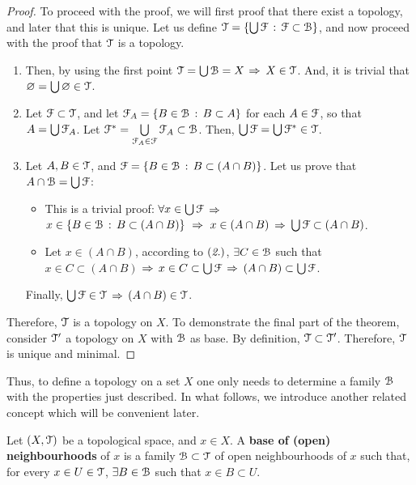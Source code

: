 \begin{proof}
	To proceed with the proof, we will first proof that there exist a topology, and later
	that this is unique.
	Let us define $\EuScript{T} = \{\bigcup \EuScript{F}\,:\,\EuScript{F}\subset \EuScript{B}\}$, and now proceed with the proof 
	that $\EuScript{T}$ is a topology.
	\begin{enumerate}
		\item Then, by using the first point $\EuScript{T} =\bigcup \EuScript{B}= X$ $\Rightarrow$ $X\in \EuScript{T}$. And, it
		is trivial that $\varnothing = \bigcup \varnothing \in \EuScript{T}$.
		
		\item Let $\EuScript{F}\subset \EuScript{T}$, and let $\EuScript{F}_A=\{B\in \EuScript{B}\,:\, B\subset A\}$ for each 
		$A\in\EuScript{F}$, so that $A=\bigcup\EuScript{F}_A$. Let $\EuScript{F}^*=\bigcup\limits_{\EuScript{F}_A\in\EuScript{F}}\EuScript{F}_A\subset\EuScript{B}$.
		Then,  $\bigcup \EuScript{F} =\bigcup\EuScript{F}^*\in\EuScript{T}$.
		
		\item Let $A, B\in \EuScript{T}$, and $\EuScript{F} = \{B\in\EuScript{B}\,:\, B \subset(A\cap B)\}$.
		Let us prove that $A\cap\EuScript{B} = \bigcup\EuScript{F}$:
		\begin{itemize}
			\item[\boxed{\supseteq}] This is a trivial proof: $\forall x\in\bigcup\EuScript{F}$ $\Rightarrow$
			$x\in\left\{B\in\EuScript{B}\,:\,B\subset(A\cap B)\right\}\ \Rightarrow\ x\in (A\cap B)$ $\Rightarrow$ 
			$\bigcup\EuScript{F} \subset (A\cap B)$.
			\item[\boxed{\subseteq}] Let $x\in (A\cap B)$, according to $(\emph{2.})$, 
			$\exists C\in \EuScript{B}$ such that $x\in C\subset (A\cap B)$ $\Rightarrow$ $x\in C\subset 
			\bigcup\EuScript{F}$ $\Rightarrow$ $(A\cap B)\subset \bigcup\EuScript{F}$.
		\end{itemize}
		Finally, $\bigcup \EuScript{F}\in \EuScript{T}$ $\Rightarrow$ $(A\cap B) \in \EuScript{T}$.
	\end{enumerate}
	Therefore, $\EuScript{T}$ is a topology on $X$.
	To demonstrate the final part of the theorem, consider $\EuScript{T}'$ a topology on $X$ with 
	$\EuScript{B}$ as base. By definition, $\EuScript{T}\subset \EuScript{T}'$. Therefore, $\EuScript{T}$ is unique and minimal.
\end{proof}

Thus, to define a topology on a set $X$ one only needs to determine a family $\EuScript{B}$ with 
the properties just described.
In what follows, we introduce another related concept which will be convenient later.
\begin{definition}
	\label{def:base-open-neighbourhoods}
	Let $(X, \EuScript{T})$ be a topological space, and $x\in X$.
	A \textbf{base of (open) neighbourhoods} of $x$ is a family $\EuScript{B}\subset\EuScript{T}$ of open 
	neighbourhoods of $x$ such that, for every $x\in U\in \EuScript{T}$, $\exists B\in\EuScript{B}$ such that
	$x\in B\subset U$.
\end{definition}


